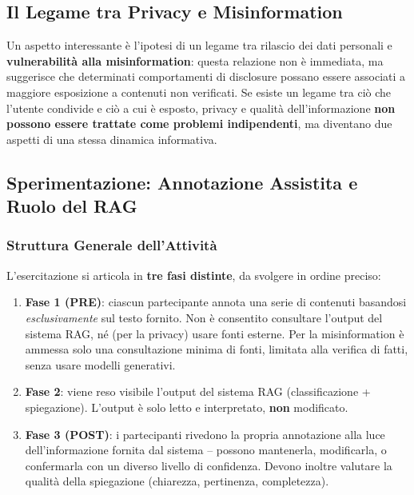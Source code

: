 \documentclass[12pt,a4paper]{article}
\begin{document}
\subsection{Il Legame tra Privacy e Misinformation}

\begin{quizbox}
Un aspetto interessante \`e l'ipotesi di un legame tra rilascio dei dati personali e \textbf{vulnerabilit\`a alla misinformation}: questa relazione non \`e immediata, ma suggerisce che determinati comportamenti di disclosure possano essere associati a maggiore esposizione a contenuti non verificati. Se esiste un legame tra ci\`o che l'utente condivide e ci\`o a cui \`e esposto, privacy e qualit\`a dell'informazione \textbf{non possono essere trattate come problemi indipendenti}, ma diventano due aspetti di una stessa dinamica informativa.
\end{quizbox}

\subsection{Sperimentazione: Annotazione Assistita e Ruolo del RAG}

\subsubsection{Struttura Generale dell'Attivit\`a}

L'esercitazione si articola in \textbf{tre fasi distinte}, da svolgere in ordine preciso:
\begin{enumerate}
  \item \textbf{Fase 1 (PRE)}: ciascun partecipante annota una serie di contenuti basandosi \emph{esclusivamente} sul testo fornito. Non \`e consentito consultare l'output del sistema RAG, n\'e (per la privacy) usare fonti esterne. Per la misinformation \`e ammessa solo una consultazione minima di fonti, limitata alla verifica di fatti, senza usare modelli generativi.
  \item \textbf{Fase 2}: viene reso visibile l'output del sistema RAG (classificazione + spiegazione). L'output \`e solo letto e interpretato, \textbf{non} modificato.
  \item \textbf{Fase 3 (POST)}: i partecipanti rivedono la propria annotazione alla luce dell'informazione fornita dal sistema -- possono mantenerla, modificarla, o confermarla con un diverso livello di confidenza. Devono inoltre valutare la qualit\`a della spiegazione (chiarezza, pertinenza, completezza).
\end{enumerate}
\end{document}
